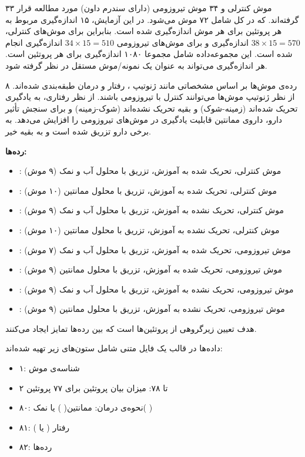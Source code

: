 ۳۳ موش کنترلی و ۳۴ موش تیروزومی
(دارای سندرم داون) مورد مطالعه قرار گرفته‌اند. که در کل شامل ۷۲ موش می‌شود. در این آزمایش، ۱۵ اندازه‌گیری مربوط به هر پروتئین برای هر موش اندازه‌گیری شده است. بنابراین برای موش‌های کنترلی، 
$38 \times 15 = 570$
اندازه‌گیری و برای موش‌های تیروزومی 
$34 \times 15 = 510$
اندازه‌گیری انجام شده است. این مجموعه‌داده شامل مجموعا ۱۰۸۰ اندازه‌گیری برای هر پروتئین است. هر اندازه‌گیری می‌تواند به عنوان یک نمونه/موش مستقل در نظر گرفته شود.

۸ رده‌ی موش‌ها بر اساس مشخصاتی مانند ژنوتیپ
، رفتار و درمان طبقه‌بندی شده‌اند. از نظر ژنوتیپ موش‌ها می‌توانند کنترل با تیروزومی باشند. از نظر رفتاری، به یادگیری تحریک شده‌اند (زمینه-شوک)
 و بقیه تحریک نشده‌اند (شوک-زمینه) و برای سنجش تأثیر دارو، داروی ممانتین%
قابلیت یادگیری در موش‌های تیروزومی را افزایش می‌دهد. به برخی دارو تزریق شده است و به بقیه خیر.

\textbf{
رده‌ها:
}

\begin{itemize}
\item
{}
: موش کنترلی، تحریک شده به آموزش، تزریق با محلول آب و نمک (۹ موش)
\item
{}
: موش کنترلی، تحریک شده به آموزش، تزریق با محلول ممانتین (۱۰ موش)
\item
{}
: موش کنترلی، تحریک نشده به آموزش، تزریق با محلول آب و نمک (۹ موش)
\item
{}
: موش کنترلی، تحریک نشده به آموزش، تزریق با محلول ممانتین (۱۰ موش)
\item
{}
: موش تیروزومی، تحریک شده به آموزش، تزریق با محلول آب و نمک (۷ موش)
\item
{}
: موش تیروزومی، تحریک شده به آموزش، تزریق با محلول ممانتین (۹ موش)
\item
{}
: موش تیروزومی، تحریک نشده به آموزش، تزریق با محلول آب و نمک (۹ موش)
\item
{}
: موش تیروزومی، تحریک نشده به آموزش، تزریق با محلول ممانتین (۹ موش)
\end{itemize}

هدف تعیین زیر‌گروهی از پروتئین‌ها است که بین رده‌ها تمایز ایجاد می‌کنند.

داده‌ها در قالب یک فایل متنی شامل ستون‌های زیر تهیه شده‌اند:

\begin{itemize}
\item
۱: شناسه‌ی موش
\item
۲ تا ۷۸: میزان بیان پروتئین برای ۷۷ پروتئین
\item
۸۰: نحوه‌ی درمان: ممانتین(%
%
) یا نمک(%
%
)
\item
۸۱: رفتار (%
یا 
%
)
\item
۸۲: رده‌ها
\end{itemize}


